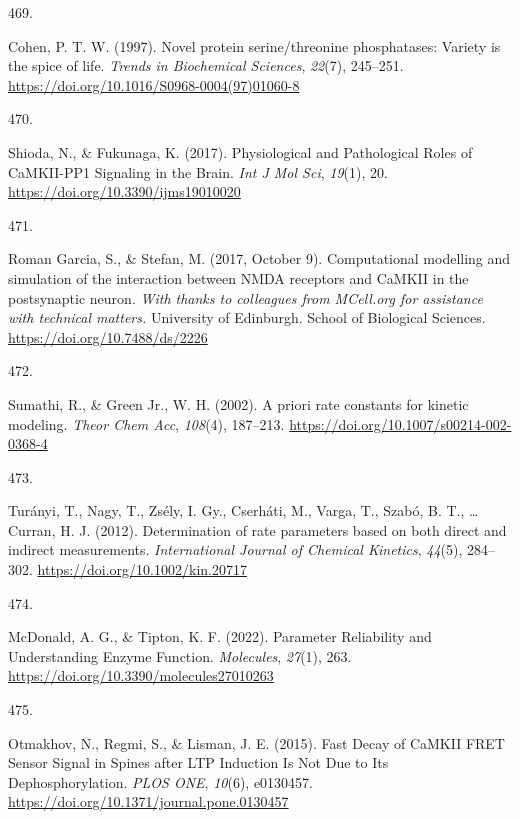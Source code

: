 \documentclass[
  11pt,
  letterpaper,
]{scrreprt}
\newlength{\cslhangindent}
\newlength{\csllabelwidth}
\newenvironment{CSLReferences}[2] %
 {\begin{list}{}{%
  \setlength{\itemindent}{0pt}
  \setlength{\leftmargin}{0pt}
  \setlength{\parsep}{0pt}
  \ifodd #1
   \setlength{\leftmargin}{\cslhangindent}
   \setlength{\itemindent}{-1\cslhangindent}
  \fi
  \setlength{\itemsep}{#2\baselineskip}}}
 {\end{list}}
\newcommand{\CSLLeftMargin}[1]{\parbox[t]{\csllabelwidth}{\strut#1\strut}}
\newcommand{\CSLRightInline}[1]{\parbox[t]{\linewidth - \csllabelwidth}{\strut#1\strut}}
\begin{document}
\begin{CSLReferences}{0}{0}
\CSLLeftMargin{469. }%
\CSLRightInline{Cohen, P. T. W. (1997). Novel protein serine/threonine
phosphatases: {Variety} is the spice of life. \emph{Trends in
Biochemical Sciences}, \emph{22}(7), 245--251.
\url{https://doi.org/10.1016/S0968-0004(97)01060-8}}

\CSLLeftMargin{470. }%
\CSLRightInline{Shioda, N., \& Fukunaga, K. (2017). Physiological and
{Pathological Roles} of {CaMKII-PP1 Signaling} in the {Brain}. \emph{Int
J Mol Sci}, \emph{19}(1), 20.
\url{https://doi.org/10.3390/ijms19010020}}

\CSLLeftMargin{471. }%
\CSLRightInline{Roman Garcia, S., \& Stefan, M. (2017, October 9).
Computational modelling and simulation of the interaction between {NMDA}
receptors and {CaMKII} in the postsynaptic neuron. \emph{With thanks to
colleagues from MCell.org for assistance with technical matters.}
University of Edinburgh. School of Biological Sciences.
\url{https://doi.org/10.7488/ds/2226}}

\CSLLeftMargin{472. }%
\CSLRightInline{Sumathi, R., \& Green Jr., W. H. (2002). A priori rate
constants for kinetic modeling. \emph{Theor Chem Acc}, \emph{108}(4),
187--213. \url{https://doi.org/10.1007/s00214-002-0368-4}}

\CSLLeftMargin{473. }%
\CSLRightInline{Turányi, T., Nagy, T., Zsély, I. Gy., Cserháti, M.,
Varga, T., Szabó, B. T., \ldots{} Curran, H. J. (2012). Determination of
rate parameters based on both direct and indirect measurements.
\emph{International Journal of Chemical Kinetics}, \emph{44}(5),
284--302. \url{https://doi.org/10.1002/kin.20717}}

\CSLLeftMargin{474. }%
\CSLRightInline{McDonald, A. G., \& Tipton, K. F. (2022). Parameter
{Reliability} and {Understanding Enzyme Function}. \emph{Molecules},
\emph{27}(1), 263. \url{https://doi.org/10.3390/molecules27010263}}

\CSLLeftMargin{475. }%
\CSLRightInline{Otmakhov, N., Regmi, S., \& Lisman, J. E. (2015). Fast
{Decay} of {CaMKII FRET Sensor Signal} in {Spines} after {LTP Induction
Is Not Due} to {Its Dephosphorylation}. \emph{PLOS ONE}, \emph{10}(6),
e0130457. \url{https://doi.org/10.1371/journal.pone.0130457}}


\end{CSLReferences}
\end{document}
